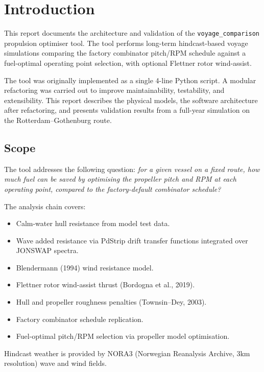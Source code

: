 \documentclass[a4paper,11pt]{article}
\author{Frode Bloch}
\date{\today}
\title{}
\begin{document}
\bvMainTitlePage
\tableofcontents
\newpage

\section{Introduction}
\label{sec:orgf2ee1fd}

This report documents the architecture and validation of the \texttt{voyage\_comparison}
propulsion optimiser tool.  The tool performs long-term hindcast-based voyage
simulations comparing the factory combinator pitch/RPM schedule against a
fuel-optimal operating point selection, with optional Flettner rotor
wind-assist.

The tool was originally implemented as a single 4-line Python
script.  A modular refactoring was carried out to improve maintainability,
testability, and extensibility.  This report describes the physical models, the
software architecture after refactoring, and presents validation results from a
full-year simulation on the Rotterdam--Gothenburg route.

\subsection{Scope}
\label{sec:orgbc42274}

The tool addresses the following question: \emph{for a given vessel on a fixed route,
how much fuel can be saved by optimising the propeller pitch and RPM at each
operating point, compared to the factory-default combinator schedule?}

The analysis chain covers:
\begin{itemize}
\item Calm-water hull resistance from model test data.
\item Wave added resistance via PdStrip drift transfer functions integrated over
JONSWAP spectra.
\item Blendermann (1994) wind resistance model.
\item Flettner rotor wind-assist thrust (Bordogna et al., 2019).
\item Hull and propeller roughness penalties (Townsin--Dey, 2003).
\item Factory combinator schedule replication.
\item Fuel-optimal pitch/RPM selection via propeller model optimisation.
\end{itemize}

Hindcast weather is provided by NORA3 (Norwegian Reanalysis Archive, 3\thinspace km
resolution) wave and wind fields.
\end{document}
